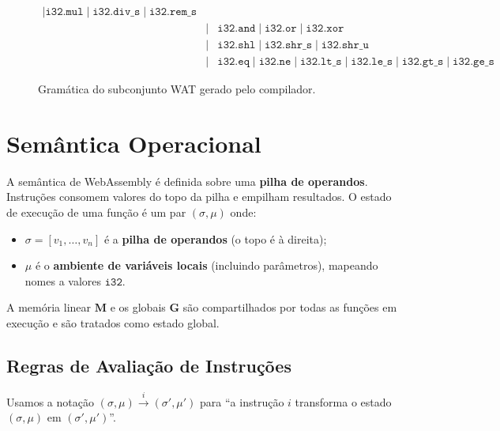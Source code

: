\begin{figure}[htbp]
\[\begin{array}{lcll}
      \mid \mathtt{i32.mul}
      \mid \mathtt{i32.div\_s} \mid \mathtt{i32.rem\_s} \\
      &\mid& \mathtt{i32.and} \mid \mathtt{i32.or} \mid \mathtt{i32.xor} \\
      &\mid& \mathtt{i32.shl} \mid \mathtt{i32.shr\_s} \mid
      \mathtt{i32.shr\_u} \\
      &\mid& \mathtt{i32.eq} \mid \mathtt{i32.ne}
      \mid \mathtt{i32.lt\_s} \mid \mathtt{i32.le\_s}
      \mid \mathtt{i32.gt\_s} \mid \mathtt{i32.ge\_s}
    \end{array}
  \]
  \caption{Gramática do subconjunto WAT gerado pelo
  compilador.}\label{fig:wat-grammar}
\end{figure}

\section{Semântica Operacional}\label{sec:wat-semantics}

A semântica de WebAssembly é definida sobre uma \textbf{pilha de operandos}.
Instruções consomem valores do topo da pilha e empilham resultados.  O estado
de execução de uma função é um par $(\sigma, \mu)$ onde:

\begin{itemize}
  \item $\sigma = [v_1, \ldots, v_n]$ é a \textbf{pilha de operandos}
    (o topo é à direita);
  \item $\mu$ é o \textbf{ambiente de variáveis locais} (incluindo parâmetros),
    mapeando nomes a valores $\mathtt{i32}$.
\end{itemize}

A memória linear $\mathbf{M}$ e os globais $\mathbf{G}$ são compartilhados por
todas as funções em execução e são tratados como estado global.

\subsection{Regras de Avaliação de Instruções}

Usamos a notação $(\sigma, \mu) \xrightarrow{i} (\sigma', \mu')$ para
``a instrução $i$ transforma o estado $(\sigma, \mu)$ em $(\sigma', \mu')$''.


